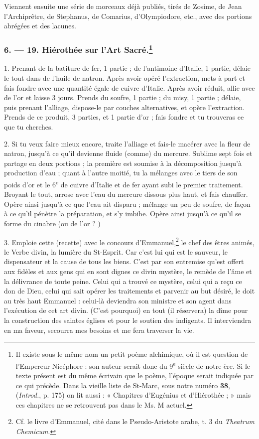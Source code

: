 \documentclass[a4paper, 11pt, oneside, polutonikogreek, french]{article}
\begin{document}
Viennent ensuite une série de morceaux déjà publiés, tirés de Zosime, de Jean l'Archiprêtre, de Stephanus, de Comarius, d'Olympiodore, etc., avec des portions abrégées et des lacunes.

\bigskip
\centerline{\EightStarTaper}
\centerline{\EightStarTaper\EightStarTaper}
\bigskip

\subsubsection[6. --- 19. Hiérothée sur l'Art Sacré.]{6. --- 19. Hiérothée sur l'Art Sacré.\footnote{Il existe sous le même nom un petit poème alchimique, où il est question de l'Empereur Nicéphore : son auteur serait donc du 9\textsuperscript{e} siècle de notre ère. Si le texte présent est du même écrivain que le poème, l'époque serait indiquée par ce qui précède. Dans la vieille liste de St-Marc, sous notre numéro \textbf{38}, (\emph{Introd.}, p. 175) on lit aussi : « Chapitres d'Eugénius et d'Hiérothée ; » mais ces chapitres ne se retrouvent pas dans le Ms. M actuel.}}

1. Prenant de la batiture de fer, 1 partie ; de l'antimoine d'Italie, 1 partie, délaie le tout dans de l'huile de natron. Après avoir opéré l'extraction, mets à part et fais fondre avec une quantité égale de cuivre d'Italie. Après avoir réduit, allie avec de l'or et laisse 3 jours. Prends du soufre, 1 partie ; du misy, 1 partie ; délaie, puis prenant l'alliage, dispose-le par couches alternatives, et opère l'extraction. Prends de ce produit, 3 parties, et 1 partie d'or ; fais fondre et tu trouveras ce que tu cherches.

2. Si tu veux faire mieux encore, traite l'alliage et fais-le macérer avec la fleur de natron, jusqu'à ce qu'il devienne fluide (comme) du mercure. Sublime sept fois et partage en deux portions ; la première est soumise à la décomposition jusqu'à production d'eau ; quant à l'autre moitié, tu la mélanges avec le tiers de son poids d'or et le 6\textsuperscript{e} de cuivre d'Italie et de fer ayant subi le premier traitement. Broyant le tout, arrose avec l'eau du mercure dissous plus haut, et fais chauffer. Opère ainsi jusqu'à ce que l'eau ait disparu ; mélange un peu de soufre, de façon à ce qu'il pénètre la préparation, et s'y imbibe. Opère ainsi jusqu'à ce qu'il se forme du cinabre (ou de l'or ? )

3. Emploie cette (recette) avec le concours d'Emmanuel,\footnote{Cf. le livre d'Emmanuel, cité dans le Pseudo-Aristote arabe, t. 3 du \emph{Theatrum Chemicum}.} le chef des êtres animés, le Verbe divin, la lumière du St-Esprit. Car c'est lui qui est le sauveur, le dispensateur et la cause de tous les biens. C'est par son entremise qu'est offert aux fidèles et aux gens qui en sont dignes ce divin mystère, le remède de l'âme et la délivrance de toute peine. Celui qui a trouvé ce mystère, celui qui a reçu ce don de Dieu, celui qui sait opérer les traitements et parvenir au but désiré, le doit au très haut Emmanuel : celui-là deviendra son ministre et son agent dans l'exécution de cet art divin. (C'est pourquoi) en tout (il réservera) la dîme pour la construction des saintes églises et pour le soutien des indigents. Il interviendra en ma faveur, secourra mes besoins et me fera traverser la vie.
\end{document}
